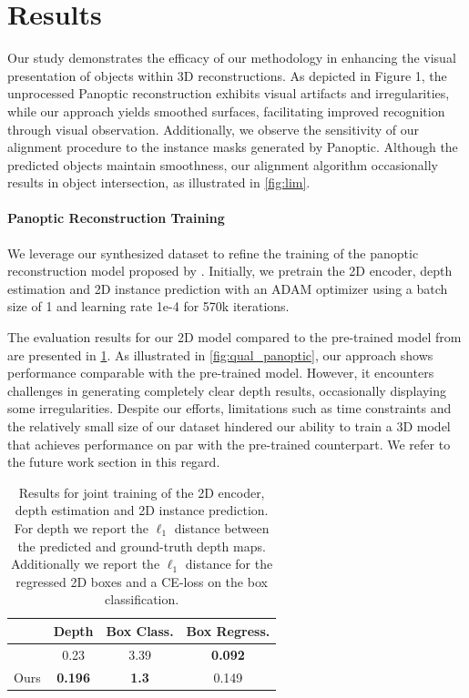 \section{Results}
\label{sec:results}

Our study demonstrates the efficacy of our methodology in enhancing the visual presentation of objects within 3D reconstructions. As depicted in Figure 1, the unprocessed Panoptic reconstruction exhibits visual artifacts and irregularities, while our approach yields smoothed surfaces, facilitating improved recognition through visual observation. Additionally, we observe the sensitivity of our alignment procedure to the instance masks generated by Panoptic. Although the predicted objects maintain smoothness, our alignment algorithm occasionally results in object intersection, as illustrated in \cref{fig:lim}.

\paragraph{Panoptic Reconstruction Training}

We leverage our synthesized dataset to refine the training of the panoptic reconstruction model proposed by \citet{dahnert2021panoptic}.
Initially, we pretrain the 2D encoder, depth estimation and 2D instance prediction with an ADAM optimizer using a batch size of 1 and learning rate 1e-4 for 570k iterations.

The evaluation results for our 2D model compared to the pre-trained model from \citet{dahnert2021panoptic} are presented in \cref{tab:2dresults}.
As illustrated in \cref{fig:qual_panoptic}, our approach shows performance comparable with the pre-trained model. However, it encounters challenges in generating completely clear depth results, occasionally displaying some irregularities.
Despite our efforts, limitations such as time constraints and the relatively small size of our dataset hindered our ability to train a 3D model that achieves performance on par with the pre-trained counterpart. We refer to the future work section in this regard.
\begin{table}
  \centering
  \begin{tabular}{@{}lccc@{}}
    \toprule
     & Depth & Box Class. & Box Regress. \\
    \midrule
    \citet{dahnert2021panoptic} & 0.23 & 3.39 & \textbf{0.092}\\
    Ours & \textbf{0.196} & \textbf{1.3} & 0.149 \\
    \bottomrule
  \end{tabular}
  \caption{Results for joint training of the 2D encoder, depth estimation and 2D instance prediction. For depth we report the $\ell_1$ distance between the predicted and ground-truth depth maps. Additionally we report the $\ell_1$ distance for the regressed 2D boxes and a CE-loss on the box classification.  }
  \label{tab:2dresults}
\end{table}

